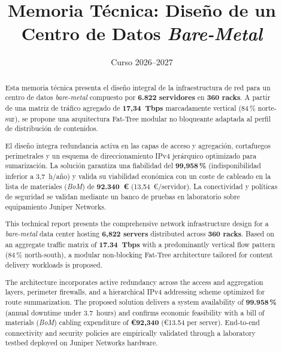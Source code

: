 \documentclass[11pt,a4paper]{article}
\title{\textbf{Memoria Técnica: Diseño de un Centro de Datos \textit{Bare-Metal}}}
\author{\autoruno \and \autordos \and \autortres \and \autorcuatro}
\date{Curso 2026--2027}
\begin{document}

    \maketitle

    \begin{abstract}
        Esta memoria técnica presenta el diseño integral de la infraestructura de red
        para un centro de datos \textit{bare-metal} compuesto por \textbf{6.822 servidores}
        en \textbf{360 racks}. A partir de una matriz de tráfico agregado de \textbf{17,34~Tbps}
        marcadamente vertical (84\,\% norte-sur), se propone una arquitectura Fat-Tree
        modular no bloqueante adaptada al perfil de distribución de contenidos.

        El diseño integra redundancia activa en las capas de acceso y agregación, cortafuegos
        perimetrales y un esquema de direccionamiento IPv4 jerárquico optimizado para
        sumarización. La solución garantiza una fiabilidad del \textbf{99,958\,\%}
        (indisponibilidad inferior a 3,7~h/año) y valida su viabilidad económica con un
        coste de cableado en la lista de materiales (\textit{BoM}) de \textbf{92.340~€}
        (13,54~€/servidor). La conectividad y políticas de seguridad se validan mediante un
        banco de pruebas en laboratorio sobre equipamiento Juniper Networks.
    \end{abstract}

    \renewcommand{\abstractname}{Abstract}
    \begin{abstract}
        This technical report presents the comprehensive network infrastructure design
        for a \textit{bare-metal} data center hosting \textbf{6,822 servers} distributed
        across \textbf{360 racks}. Based on an aggregate traffic matrix of \textbf{17.34~Tbps}
        with a predominantly vertical flow pattern (84\,\% north-south), a modular non-blocking
        Fat-Tree architecture tailored for content delivery workloads is proposed.

        The architecture incorporates active redundancy across the access and aggregation layers,
        perimeter firewalls, and a hierarchical IPv4 addressing scheme optimized for route
        summarization. The proposed solution delivers a system availability of \textbf{99.958\,\%}
        (annual downtime under 3.7~hours) and confirms economic feasibility with a bill of materials
        (\textit{BoM}) cabling expenditure of \textbf{€92,340} (€13.54 per server). End-to-end
        connectivity and security policies are empirically validated through a laboratory testbed
        deployed on Juniper Networks hardware.
    \end{abstract}
\end{document}
